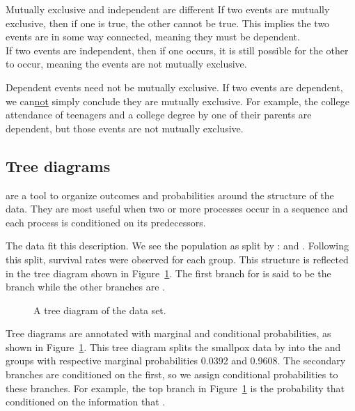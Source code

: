\begin{onebox}{Mutually exclusive and independent are different}
If two events are mutually exclusive, then if one is true, the other cannot be true. This implies the two events are in some way connected, meaning they must be dependent.\\
If two events are independent, then if one occurs, it is still possible for the other to occur, meaning the events are not mutually exclusive.\end{onebox}

\begin{onebox}{Dependent events need not be mutually exclusive.}
{If two events are dependent, we can\underline{not} simply conclude they are mutually exclusive. For example, the college attendance of teenagers and a college degree by one of their parents are dependent, but those events are not mutually exclusive.}
\end{onebox}


\D{\newpage}

\subsection{Tree diagrams}


 are a tool to organize outcomes and probabilities around the structure of the data. They are most useful when two or more processes occur in a sequence and each process is conditioned on its predecessors.

The  data fit this description. We see the population as split by :  and . Following this split, survival rates were observed for each group. This structure is reflected in the tree diagram shown in Figure~\ref{smallpoxTreeDiagram}. The first branch for  is said to be the  branch while the other branches are .

\begin{figure}[ht]
\centering
{}
\caption{A tree diagram of the  data set.}
\label{smallpoxTreeDiagram}
\end{figure}

Tree diagrams are annotated with marginal and conditional probabilities, as shown in Figure~\ref{smallpoxTreeDiagram}. This tree diagram splits the smallpox data by  into the  and  groups with respective marginal probabilities 0.0392 and 0.9608. The secondary branches are conditioned on the first, so we assign conditional probabilities to these branches.
For example, the top branch in Figure~\ref{smallpoxTreeDiagram} is the probability that  conditioned on the information that .

